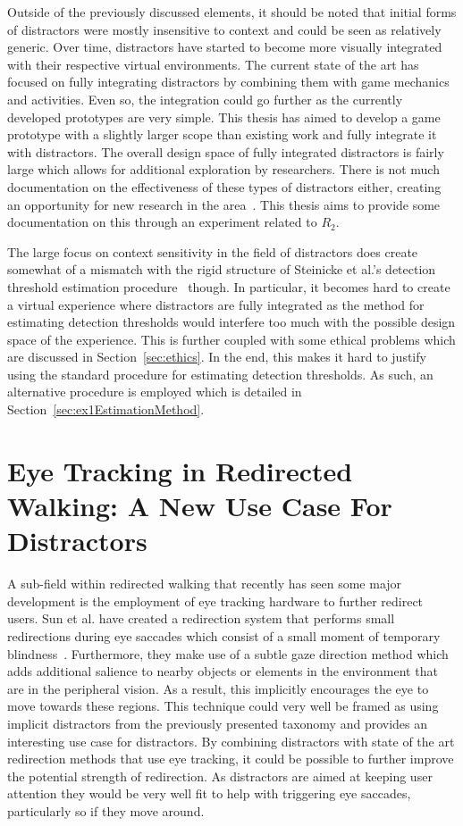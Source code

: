 Outside of the previously discussed elements, it should be noted that initial forms of distractors were mostly insensitive to context and could be seen as relatively generic. Over time, distractors have started to become more visually integrated with their respective virtual environments. The current state of the art has focused on fully integrating distractors by combining them with game mechanics and activities. Even so, the integration could go further as the currently developed prototypes are very simple. This thesis has aimed to develop a game prototype with a slightly larger scope than existing work and fully integrate it with distractors. The overall design space of fully integrated distractors is fairly large which allows for additional exploration by researchers. There is not much documentation on the effectiveness of these types of distractors either, creating an opportunity for new research in the area~\cite{nilsson201815}. This thesis aims to provide some documentation on this through an experiment related to $R_2$.

The large focus on context sensitivity in the field of distractors does create somewhat of a mismatch with the rigid structure of Steinicke et al.'s detection threshold estimation procedure~\cite{5072212} though. In particular, it becomes hard to create a virtual experience where distractors are fully integrated as the method for estimating detection thresholds would interfere too much with the possible design space of the experience. This is further coupled with some ethical problems which are discussed in Section~\ref{sec:ethics}. In the end, this makes it hard to justify using the standard procedure for estimating detection thresholds. As such, an alternative procedure is employed which is detailed in Section~\ref{sec:ex1EstimationMethod}. 

\section{Eye Tracking in Redirected Walking: A New Use Case For Distractors}\label{sec:relatedEyeTracking}
A sub-field within redirected walking that recently has seen some major development is the employment of eye tracking hardware to further redirect users. Sun et al. have created a redirection system that performs small redirections during eye saccades which consist of a small moment of temporary blindness~\cite{sun2018towards}. Furthermore, they make use of a subtle gaze direction method which adds additional salience to nearby objects or elements in the environment that are in the peripheral vision. As a result, this implicitly encourages the eye to move towards these regions. This technique could very well be framed as using implicit distractors from the previously presented taxonomy and provides an interesting use case for distractors. By combining distractors with state of the art redirection methods that use eye tracking, it could be possible to further improve the potential strength of redirection. As distractors are aimed at keeping user attention they would be very well fit to help with triggering eye saccades, particularly so if they move around. 

